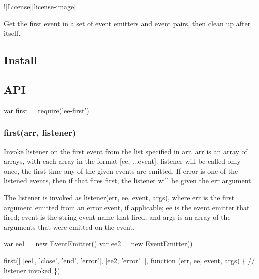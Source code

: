 \href{https://npmjs.org/package/ee-first}{\tt } \href{https://travis-ci.org/jonathanong/ee-first}{\tt } \href{https://coveralls.io/r/jonathanong/ee-first?branch=master}{\tt } \mbox{\hyperlink{worker-farm_2_l_i_c_e_n_s_e_8md}{!\mbox{[}License\mbox{]}\mbox{[}license-\/image\mbox{]}}} \href{https://npmjs.org/package/ee-first}{\tt } \href{https://www.gittip.com/jonathanong/}{\tt }

Get the first event in a set of event emitters and event pairs, then clean up after itself.

\subsection*{Install}




\subsection*{A\+PI}


\begin{DoxyCode}
var first = require('ee-first')
\end{DoxyCode}


\subsubsection*{first(arr, listener)}

Invoke {\ttfamily listener} on the first event from the list specified in {\ttfamily arr}. {\ttfamily arr} is an array of arrays, with each array in the format {\ttfamily \mbox{[}ee, ...event\mbox{]}}. {\ttfamily listener} will be called only once, the first time any of the given events are emitted. If {\ttfamily error} is one of the listened events, then if that fires first, the {\ttfamily listener} will be given the {\ttfamily err} argument.

The {\ttfamily listener} is invoked as {\ttfamily listener(err, ee, event, args)}, where {\ttfamily err} is the first argument emitted from an {\ttfamily error} event, if applicable; {\ttfamily ee} is the event emitter that fired; {\ttfamily event} is the string event name that fired; and {\ttfamily args} is an array of the arguments that were emitted on the event.


\begin{DoxyCode}
var ee1 = new EventEmitter()
var ee2 = new EventEmitter()

first([
  [ee1, 'close', 'end', 'error'],
  [ee2, 'error']
], function (err, ee, event, args) \{
  // listener invoked
\})
\end{DoxyCode}


